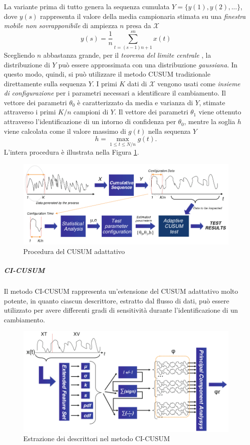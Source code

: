 La variante prima di tutto genera la sequenza cumulata
$Y=\{y(1),y(2),...\}$, dove $y(s)$ rappresenta il
valore della media campionaria stimata su una
\textit{finestra mobile non sovrapponibile} di
ampiezza $n$ presa da $\mathcal{X}$
\[ y(s) = \frac{1}{n} \sum_{t=(s-1)n+1}^{sn}x(t) \]
Scegliendo $n$ abbastanza grande, per il
\textit{teorema del limite centrale}
\cite{ross2009introduction}, la distribuzione di $Y$
pu\`o essere approssimata con una distribuzione
\textit{gaussiana}. In questo modo, quindi, si pu\`o
utilizzare il metodo CUSUM tradizionale direttamente
sulla sequenza $Y$. I primi $K$ dati di $\mathcal{X}$ vengono
usati come \textit{insieme di configurazione} per i
parametri necessari a identificare il cambiamento. Il
vettore dei parametri $\theta_0$ \`e caratterizzato da
media e varianza di $Y$, stimate attraverso i primi
$K/n$ campioni di $Y$. Il vettore dei parametri
$\theta_1$ viene ottenuto attraverso l'identificazione
di un intorno di confidenza per $\theta_0$, mentre la
soglia $h$ viene calcolata come il valore massimo di
$g(t)$ nella sequenza $Y$
\[ h=\max_{1\leq t\leq N/n}g(t). \]
\noindent L'intera procedura \`e illustrata nella
Figura \ref{fig:adaptiveCUSUM}.
\begin{figure}
	\centering
	\includegraphics[width=12cm,keepaspectratio]{pictures/adaptiveCUSUM}
	\caption{Procedura del CUSUM
		adattativo}
	\label{fig:adaptiveCUSUM}
\end{figure}
\subparagraph{CI-CUSUM} Il metodo
CI-CUSUM rappresenta un'estensione del
CUSUM adattativo molto potente, in
quanto ciascun descrittore, estratto
dal flusso di dati, pu\`o essere
utilizzato per avere differenti gradi
di sensitivit\`a durante
l'identificazione di un cambiamento.
\begin{figure}
	\centering
	\includegraphics[width=12cm,keepaspectratio]{pictures/CI-CUSUM}
	\caption{Estrazione dei descrittori
		nel metodo CI-CUSUM}
	\label{fig:CI-CUSUM}
\end{figure}
